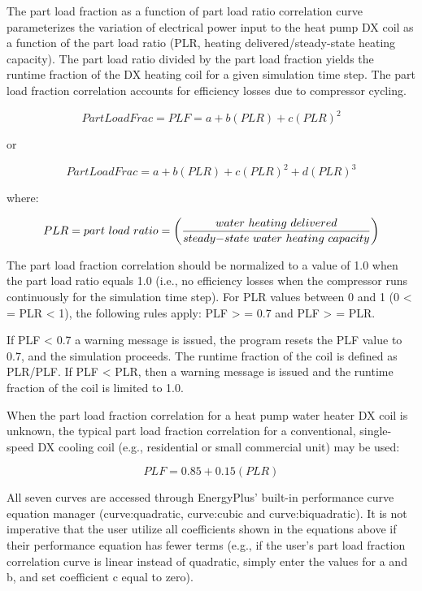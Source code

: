 The part load fraction as a function of part load ratio correlation curve parameterizes the variation of electrical power input to the heat pump DX coil as a function of the part load ratio (PLR, heating delivered/steady-state heating capacity). The part load ratio divided by the part load fraction yields the runtime fraction of the DX heating coil for a given simulation time step. The part load fraction correlation accounts for efficiency losses due to compressor cycling.

\begin{equation}
PartLoadFrac = PLF = a + b\left( {PLR} \right) + c{\left( {PLR} \right)^2}
\end{equation}

or

\begin{equation}
PartLoadFrac = a + b\left( {PLR} \right) + c{\left( {PLR} \right)^2} + d{\left( {PLR} \right)^3}
\end{equation}

where:

\begin{equation}
PLR = part~load~ratio = \left( {\frac{{water~heating~delivered}}{{steady{\rm{ - }}state~water~heating~capacity}}} \right)
\end{equation}

The part load fraction correlation should be normalized to a value of 1.0 when the part load ratio equals 1.0 (i.e., no efficiency losses when the compressor runs continuously for the simulation time step). For PLR values between 0 and 1 (0 \textless{} = PLR \textless{} 1), the following rules apply:  PLF \textgreater{} = 0.7 and PLF \textgreater{} = PLR.

If PLF \textless{} 0.7 a warning message is issued, the program resets the PLF value to 0.7, and the simulation proceeds. The runtime fraction of the coil is defined as PLR/PLF. If PLF \textless{} PLR, then a warning message is issued and the runtime fraction of the coil is limited to 1.0.

When the part load fraction correlation for a heat pump water heater DX coil is unknown, the typical part load fraction correlation for a conventional, single-speed DX cooling coil (e.g., residential or small commercial unit) may be used:

\begin{equation}
PLF = 0.85 + 0.15(PLR)
\end{equation}

All seven curves are accessed through EnergyPlus' built-in performance curve equation manager (curve:quadratic, curve:cubic and curve:biquadratic). It is not imperative that the user utilize all coefficients shown in the equations above if their performance equation has fewer terms (e.g., if the user's part load fraction correlation curve is linear instead of quadratic, simply enter the values for a and b, and set coefficient c equal to zero).

